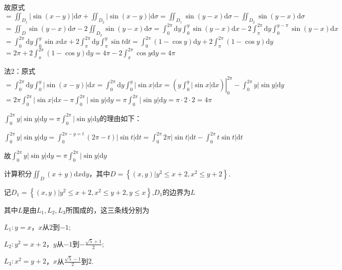 \begin{xiti}
\begin{solution}
		故原式$=\iint_{D_{1}}|\sin (x-y)| \mathrm{d} \sigma+\iint_{D_{2}}|\sin (x-y)| \mathrm{d} \sigma=\iint_{D_{1}} \sin (y-x) \mathrm{d} \sigma-\iint_{D_{2}} \sin (y-x) \mathrm{d} \sigma$
		$=\iint_{D} \sin (y-x) \mathrm{d} \sigma-2 \iint_{D_{2}} \sin (y-x) \mathrm{d} \sigma=\int_{0}^{2 \pi} \mathrm{d} y \int_{0}^{y} \sin (y-x) \mathrm{d} x-2 \int_{\pi}^{2 \pi} \mathrm{d} y \int_{0}^{y-\pi} \sin (y-x) \mathrm{d} x$
		$=\int_{0}^{2 \pi} \mathrm{d} y \int_{0}^{y} \sin x \mathrm{d} x+2 \int_{\pi}^{2 \pi} \mathrm{d} y \int_{\pi}^{y} \sin t \mathrm{d} t=\int_{0}^{2 \pi}(1-\cos y) \mathrm{d} y+2 \int_{\pi}^{2 \pi}(1-\cos y) \mathrm{d} y$
		$=2 \pi+2 \int_{\pi}^{2 \pi}(1-\cos y) \mathrm{d} y=4 \pi-2 \int_{\pi}^{2 \pi} \cos y \mathrm{d} y=4 \pi$
		
		法2：原式$=\int_{0}^{2 \pi} \mathrm{d} y \int_{0}^{y}|\sin (x-y)| \mathrm{d} x=\int_{0}^{2 \pi} \mathrm{d} y \int_{0}^{y}|\sin x| \mathrm{d} x=\left.\left(y \int_{0}^{y}|\sin x| \mathrm{d} x\right)\right|_{0} ^{2 \pi}-\int_{0}^{2 \pi} y|\sin y| \mathrm{d} y$
		$=2 \pi \int_{0}^{2 \pi}|\sin x| \mathrm{d} x-\pi \int_{0}^{2 \pi}|\sin y| \mathrm{d} y=\pi \int_{0}^{2 \pi}|\sin y| \mathrm{d} y=\pi \cdot 2 \cdot 2=4 \pi$
		
		\begin{note}
		$\int_{0}^{2 \pi} y|\sin y| \mathrm{d} y=\pi \int_{0}^{2 \pi}|\sin y| \mathrm{d} y$的理由如下：
		
		$\int_{0}^{2 \pi} y|\sin y| \mathrm{d} y=\int_{0}^{2 \pi-y=t}(2 \pi-t)|\sin t| \mathrm{d} t=\int_{0}^{2 \pi} 2 \pi|\sin t| \mathrm{d} t-\int_{0}^{2 \pi} t \sin t | \mathrm{d} t$
		
		故$\int_{0}^{2 \pi} y|\sin y| \mathrm{d} y=\pi \int_{0}^{2 \pi}|\sin y| \mathrm{d} y$
		\end{note}
	\end{solution}
	\item 计算积分$\iint_{D}(x+y) \mathrm{d} x \mathrm{d}y$，其中$D=\left\{(x, y) | y^{2} \leqslant x+2, x^{2} \leqslant y+2\right\}$.
	\begin{solution}
		记$D_{1}=\left\{(x, y) | y^{2} \leqslant x+2, x^{2} \leqslant y+2, y \leqslant x \right\}$,$D_{1}$的边界为$L$
		
		其中$L$是由$L_{1},L_{2},L_{3}$所围成的，这三条线分别为
		
		$L_{1}:y=x$，$x$从$2$到$-1$;
		
		$L_{2}:y^{2}=x+2$，$y$从$-1$到$-\frac{\sqrt{5}+1}{2}$;
		
		$L_{3}:x^{2}=y+2$，$x$从$\frac{\sqrt{5}-1}{2}$到$2$.
		

\end{solution}
\end{xiti}
